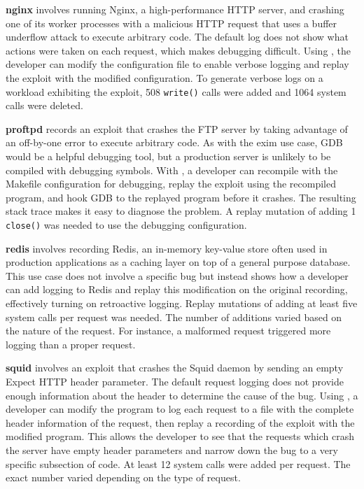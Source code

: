 {\bf nginx} involves running Nginx, a high-performance HTTP server,
and crashing one of its worker processes with a malicious HTTP request
that uses a buffer underflow attack to execute arbitrary code.
The default log does not show what actions were taken on
each request, which makes debugging difficult. Using {\dora}, the
developer can modify the configuration file to enable verbose logging and
replay the exploit with the modified configuration.
To generate verbose logs on a workload exhibiting the exploit, 508 {\tt write()}
calls were added and 1064 system calls were deleted.

{\bf proftpd} records an exploit that crashes the FTP server by taking
advantage of an off-by-one error to execute arbitrary code. As with the exim
use case, GDB would be a helpful debugging tool, but a production server is
unlikely to be compiled with debugging symbols. With {\dora}, a developer can
recompile
with the Makefile configuration for debugging, replay
the exploit using the recompiled program, and hook
GDB to the replayed program before it crashes. The resulting stack
trace makes it easy to diagnose the problem. A replay mutation of
adding 1 {\tt close()} was needed to use the debugging configuration.

{\bf redis} involves recording Redis, an in-memory key-value store often
used in production applications as a caching layer on top of a general purpose
database. This use case does not involve a specific bug but instead shows how a
developer can add logging to Redis and replay this modification on the original
recording, effectively turning on retroactive logging. Replay mutations of
adding at least
five system calls per request was needed. The number of additions varied
based on the nature of the request. For instance, a malformed request triggered
more logging than a proper request.

{\bf squid} involves an exploit that crashes the Squid daemon by sending an
empty Expect HTTP header parameter.
The default request logging does not provide enough information about the header to
determine the cause of the bug. Using {\dora}, a developer can
modify the program to log each request to a file with the complete
header information of the request, then replay a recording of the exploit with
the modified program. This allows the developer to see that the
requests which crash the server have empty header parameters and
narrow down the bug to a very specific subsection of code.
At least 12 system calls were added per request. The exact number varied
depending on the type of request.

